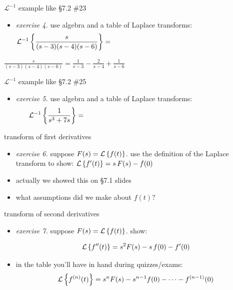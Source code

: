 \documentclass[dvipsnames,colorlinks]{beamer}
\begin{document}
\begin{frame}{$\mathcal{L}^{-1}$ example like \S7.2 \#23}

\begin{itemize}
\item \emph{exercise 4.}  use algebra and a table of Laplace transforms:
    $$\LLi{\frac{s}{(s-3)(s-4)(s-6)}} = \hspace{80mm}$$
\end{itemize}

\vspace{45mm}

\footnotesize
\hfill $\frac{s}{(s-3)(s-4)(s-6)} = \frac{1}{s-3} - \frac{2}{s-4} + \frac{1}{s-6}$
\end{frame}


\begin{frame}{$\mathcal{L}^{-1}$ example like \S7.2 \#25}

\begin{itemize}
\item \emph{exercise 5.}  use algebra and a table of Laplace transforms:
    $$\LLi{\frac{1}{s^3+7s}} = \hspace{80mm}$$
\end{itemize}

\vspace{50mm}
\end{frame}


\begin{frame}{transform of first derivatives}

\begin{itemize}
\item \emph{exercise 6.}  suppose $F(s) = \mathcal{L}\left\{f(t)\right\}$.  use the definition of the Laplace transform to show: \qquad $\mathcal{L}\left\{f'(t)\right\} = s\, F(s) - f(0)$

\vspace{40mm}
\footnotesize
\item actually we showed this on \S7.1 slides
\item what assumptions did we make about $f(t)$?
\end{itemize}
\end{frame}


\begin{frame}{transform of second derivatives}

\begin{itemize}
\item \emph{exercise 7.}  suppose $F(s) = \mathcal{L}\left\{f(t)\right\}$.  show:

$$\mathcal{L}\left\{f''(t)\right\} = s^2 F(s) - s\, f(0) - f'(0)$$

\vspace{40mm}
\footnotesize
\item in the table you'll have in hand during quizzes/exams:
   $$\mathcal{L}\left\{f^{(n)}(t)\right\} = s^n F(s) - s^{n-1} f(0) - \dots - f^{(n-1)}(0)$$
\end{itemize}
\end{frame}
\end{document}
